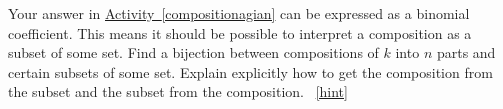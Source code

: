 \documentclass{book}
\begin{document}
\setcounter{project}{129}
\addtocounter{project}{-1}
\begin{activity}[]\label{activity-122}
\hypertarget{p-906}{}%
Your answer in \hyperref[compositionagian]{Activity~\ref{compositionagian}} can be expressed as a binomial coefficient. This means it should be possible to interpret a composition as a subset of some set. Find a bijection between compositions of \(k\) into \(n\) parts and certain subsets of some set.  Explain explicitly how to get the composition from the subset and the subset from the composition.%
~\hfill{\tiny\hyperlink{a-129}{[hint]}\hypertarget{q-129}{}}\end{activity}
\end{document}
